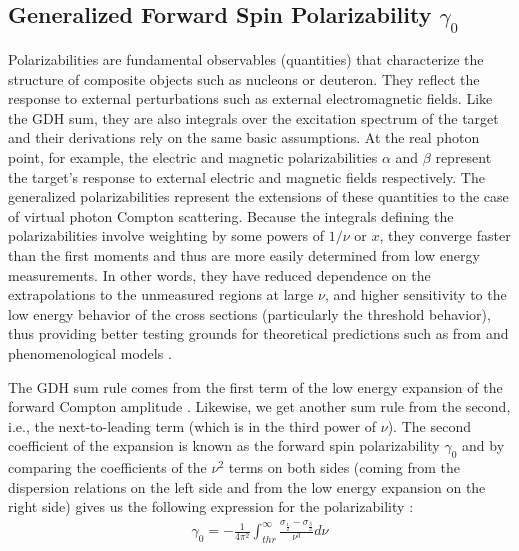 \pagebreak   %
\subsection{Generalized Forward Spin Polarizability $\gamma_0$}
Polarizabilities are fundamental observables (quantities) that characterize the structure of composite objects such as nucleons or deuteron. They reflect the response to external perturbations such as %
external electromagnetic fields. Like the GDH sum, they are also %
integrals over the excitation spectrum of the target and their derivations rely on the same basic assumptions. At the real photon point, for example, the electric and magnetic polarizabilities $\alpha$ and $\beta$ represent the target's response to %
external electric and magnetic fields respectively. %
The generalized polarizabilities represent the extensions of these quantities to the case of virtual photon Compton scattering. Because the integrals defining the polarizabilities involve weighting by some powers of $1/\nu$ or $x$, they converge faster than the first moments and thus are more easily %
determined from low energy measurements. In other words, they have reduced dependence on the extrapolations to the unmeasured regions at large $\nu$, and higher sensitivity to the low energy behavior of the cross sections (particularly the threshold behavior), thus providing better testing grounds for theoretical predictions such as from \chipts and phenomenological models \cite{propE06_017}. %

The GDH sum rule comes from the first term of the %
low energy expansion %
of the forward Compton amplitude \cite{MBurkardtG2}. %
Likewise, we get another sum rule from the second, i.e., the next-to-leading term (which is in the third power of $\nu$). The second coefficient of the expansion is known as the forward spin polarizability $\gamma_0$ and by comparing the coefficients of the $\nu^2$ terms on both sides (coming from the dispersion relations on the left side and from the low energy expansion on the right side) gives us the following expression for the polarizability \cite{propE03_006}:
\begin{eqnarray}
\label{polzGm0}
\gamma_0 = -\frac{1}{4 \pi^2} \int_{thr}^{\infty } \frac{\sigma_{\frac{1}{2}} - \sigma_{\frac{3}{2}}}{\nu^3} d\nu
\end{eqnarray}

